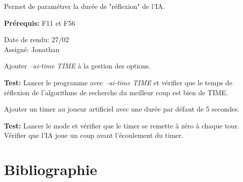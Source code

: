 \documentclass{article}
\begin{document}
\begin{needbox}
    Permet de paramétrer la durée de "réflexion" de l'IA.

    \textbf{Prérequis:} F11 et F56
    \begin{duedatebox}
        Date de rendu: 27/02\\
        Assigné: Jonathan
    \end{duedatebox}
    \begin{subneedbox}
        Ajouter \textit{--ai-time TIME} à la gestion des options.

        \textbf{Test:} Lancer le programme avec \textit{--ai-time TIME} et vérifier que
        le temps de réflexion de l'algorithme de recherche du meilleur coup est bien de TIME.
    \end{subneedbox}
    \begin{subneedbox}
        Ajouter un timer au joueur artificiel avec une durée par défaut de 5 secondes.

        \textbf{Test:} Lancer le mode et vérifier que le timer se remette à zéro à chaque tour.
         Vérifier que l'IA joue un coup avant l'écoulement du timer.
    \end{subneedbox}
\end{needbox}


\pagebreak
\section{Bibliographie}


\end{document}
